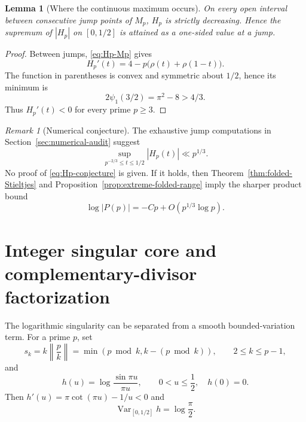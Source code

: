 \documentclass[11pt]{amsart}
\numberwithin{equation}{section}
\newtheorem{lemma}[theorem]{Lemma}
\theoremstyle{definition}
\theoremstyle{remark}
\newtheorem{remark}[theorem]{Remark}
\begin{document}
\begin{lemma}[Where the continuous maximum occurs]\label{lem:Hp-jumps}
On every open interval between consecutive jump points of \(M_p\),
\(H_p\) is strictly decreasing.  Hence the supremum of \(|H_p|\) on
\([0,1/2]\) is attained as a one-sided value at a jump.
\end{lemma}

\begin{proof}
Between jumps, \eqref{eq:Hp-Mp} gives
\[
 H_p'(t)=4-p\bigl(\rho(t)+\rho(1-t)\bigr).
\]
The function in parentheses is convex and symmetric about \(1/2\), hence
its minimum is
\[
 2\psi_1(3/2)=\pi^2-8>4/3.
\]
Thus \(H_p'(t)<0\) for every prime \(p\ge3\).
\end{proof}

\begin{remark}[Numerical conjecture]\label{rem:Hp-conjecture}
The exhaustive jump computations in Section~\ref{sec:numerical-audit}
suggest
\begin{equation}\label{eq:Hp-conjecture}
 \sup_{p^{-2/3}\le t\le1/2}|H_p(t)|\ll p^{1/3}.
\end{equation}
No proof of \eqref{eq:Hp-conjecture} is given.  If it holds, then
Theorem~\ref{thm:folded-Stieltjes} and
Proposition~\ref{prop:extreme-folded-range} imply the sharper product bound
\begin{equation}\label{eq:Hp-conjecture-consequence}
 \log|P(p)|=-Cp+O(p^{1/3}\log p).
\end{equation}
\end{remark}

\section{Integer singular core and complementary-divisor factorization}
\label{sec:integer-core}

The logarithmic singularity can be separated from a smooth
bounded-variation term.  For a prime \(p\), set
\begin{equation}\label{eq:sk-def}
 s_k=k\left\|\frac pk\right\|
 =\min(p\bmod k,k-(p\bmod k)),
 \qquad 2\le k\le p-1,
\end{equation}
and
\begin{equation}\label{eq:h-def}
 h(u)=\log\frac{\sin\pi u}{\pi u},\qquad 0<u\le\frac12,
 \quad h(0)=0.
\end{equation}
Then \(h'(u)=\pi\cot(\pi u)-1/u<0\) and
\begin{equation}\label{eq:h-variation}
 \operatorname{Var}_{[0,1/2]}h=\log\frac\pi2.
\end{equation}
\end{document}

